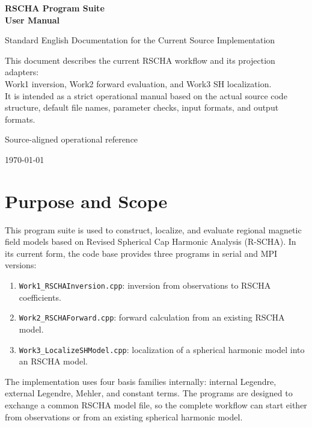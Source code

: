\documentclass[11pt,a4paper]{article}
\begin{document}
\begin{titlepage}
  \centering
  \vspace*{2.5cm}
  {\Huge\bfseries RSCHA Program Suite\\[0.4em]User Manual\par}
  \vspace{1cm}
  {\Large Standard English Documentation for the Current Source Implementation\par}
  \vspace{1.6cm}
  \begin{minipage}{0.88\textwidth}
    \centering
    \setlength{\fboxsep}{14pt}
    \colorbox{lightaccent}{\parbox{0.9\textwidth}{\centering
    This document describes the current RSCHA workflow and its projection adapters:\\[0.3em]
    Work1 inversion, Work2 forward evaluation, and Work3 SH localization.\\[0.3em]
    It is intended as a strict operational manual based on the actual source code structure, default file names, parameter checks, input formats, and output formats.}}
  \end{minipage}
  \vfill
  {\large Source-aligned operational reference\par}
  \vspace{0.6cm}
  {\large \today\par}
\end{titlepage}

\tableofcontents
\newpage

\section{Purpose and Scope}

This program suite is used to construct, localize, and evaluate regional magnetic field models based on Revised Spherical Cap Harmonic Analysis (R-SCHA). In its current form, the code base provides three programs in serial and MPI versions:
\begin{enumerate}
  \item \texttt{Work1\_RSCHAInversion.cpp}: inversion from observations to RSCHA coefficients.
  \item \texttt{Work2\_RSCHAForward.cpp}: forward calculation from an existing RSCHA model.
  \item \texttt{Work3\_LocalizeSHModel.cpp}: localization of a spherical harmonic model into an RSCHA model.
\end{enumerate}

The implementation uses four basis families internally: internal Legendre, external Legendre, Mehler, and constant terms. The programs are designed to exchange a common RSCHA model file, so the complete workflow can start either from observations or from an existing spherical harmonic model.
\end{document}
